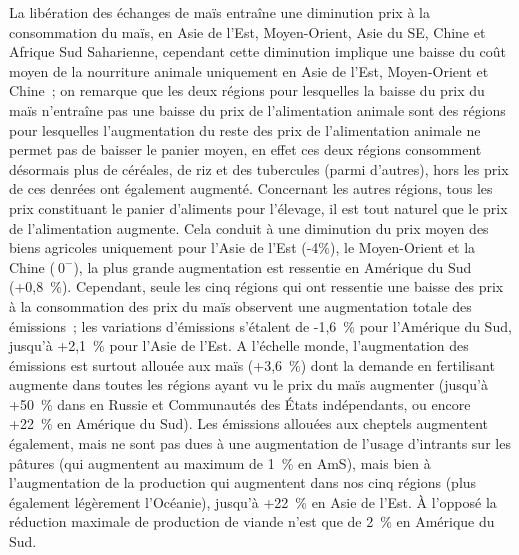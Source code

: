 La libération des échanges de maïs entraîne une diminution prix à la consommation du maïs, en Asie de l'Est, Moyen-Orient, Asie du SE, Chine et Afrique Sud Saharienne, cependant cette diminution implique une baisse du coût moyen de la nourriture animale uniquement en Asie de l'Est, Moyen-Orient et Chine~; on remarque que les deux régions pour lesquelles la baisse du prix du maïs n'entraîne pas une baisse du prix de l'alimentation animale sont des régions pour lesquelles l'augmentation du reste des prix de l'alimentation animale ne permet pas de baisser le panier moyen, en effet ces deux régions consomment désormais plus de céréales, de riz et des tubercules (parmi d'autres), hors les prix de ces denrées ont également augmenté. Concernant les autres régions, tous les prix constituant le panier d'aliments pour l'élevage, il est tout naturel que le prix de l'alimentation augmente. Cela conduit à une diminution du prix moyen des biens agricoles uniquement pour l'Asie de l'Est (-4\%), le Moyen-Orient et la Chine ($~0^-$), la plus grande augmentation est ressentie en Amérique du Sud (+0,8~\%). Cependant, seule les cinq régions qui ont ressentie une baisse des prix à la consommation des prix du maïs observent une augmentation totale des émissions~; les variations d'émissions s’étalent de -1,6~\% pour l'Amérique du Sud, jusqu'à +2,1~\% pour l'Asie de l'Est. A l'échelle monde, l'augmentation des émissions est surtout allouée aux maïs (+3,6~\%) dont la demande en fertilisant augmente dans toutes les régions ayant vu le prix du maïs augmenter (jusqu'à +50~\% dans en Russie et Communautés des États indépendants, ou encore +22~\% en Amérique du Sud). Les émissions allouées aux cheptels augmentent également, mais ne sont pas dues à une augmentation de l'usage d'intrants sur les pâtures (qui augmentent au maximum de 1~\% en AmS), mais bien à l'augmentation de la production qui augmentent dans nos cinq régions (plus également légèrement l'Océanie), jusqu'à +22~\% en Asie de l'Est. À l'opposé la réduction maximale de production de viande n'est que de 2~\% en Amérique du Sud.

